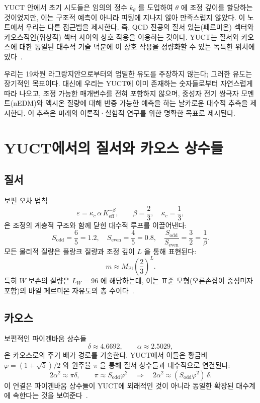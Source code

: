 \documentclass[11pt,a4paper]{article}
\begin{document}
	YUCT 안에서 초기 시도들은 임의의 정수 \(k_\theta\) 를 도입하여 \(\theta\) 에 조정 깊이를 할당하는 것이었지만, 이는 구조적 예측이 아니라 피팅에 지나지 않아 만족스럽지 않았다. 이 노트에서 우리는 다른 접근법을 제시한다. 즉, QCD 진공의 질서 있는(페르미온) 섹터와 카오스적인(위상적) 섹터 사이의 상호 작용을 이용하는 것이다. YUCT는 질서와 카오스에 대한 통일된 대수적 기술 덕분에 이 상호 작용을 정량화할 수 있는 독특한 위치에 있다~\cite{Y2,Feig}.
	
	우리는 19차원 라그랑지안으로부터의 엄밀한 유도를 주장하지 않는다; 그러한 유도는 장기적인 목표이다. 대신에 우리는 YUCT에 이미 존재하는 숫자들로부터 자연스럽게 따라 나오고, 조정 가능한 매개변수를 전혀 포함하지 않으며, 중성자 전기 쌍극자 모멘트(nEDM)와 액시온 질량에 대해 반증 가능한 예측을 하는 날카로운 대수적 추측을 제시한다. 이 추측은 미래의 이론적·실험적 연구를 위한 명확한 목표로 제시된다.
	
	\section{YUCT에서의 질서와 카오스 상수들}
	\label{sec:oc}
	
	\subsection{질서}
	보편 오차 법칙
	\[
	\varepsilon = \kappa_c\,\alpha\,K_{\mathrm{eff}}^{-\beta},\qquad \beta = \frac{2}{3},\quad \kappa_c = \frac{1}{3},
	\]
	은 조정의 계층적 구조와 함께 닫힌 대수적 루프를 이끌어낸다:
	\[
	S_{\mathrm{odd}} = \frac{6}{5} = 1.2,\quad S_{\mathrm{even}} = \frac{4}{5} = 0.8,\quad 
	\frac{S_{\mathrm{odd}}}{S_{\mathrm{even}}} = \frac{3}{2} = \frac{1}{\beta}.
	\]
	모든 물리적 질량은 플랑크 질량과 조정 깊이 \(L\) 을 통해 표현된다:
	\[
	m \approx M_{\mathrm{Pl}}\left(\frac{2}{3}\right)^L.
	\]
	특히 \(W\) 보손의 질량은 \(L_W = 96\) 에 해당하는데, 이는 표준 모형(오른손잡이 중성미자 포함)의 바일 페르미온 자유도의 총 수이다~\cite{Y3}.
	
	\subsection{카오스}
	보편적인 파이겐바움 상수들
	\[
	\delta \approx 4.6692,\qquad \alpha \approx 2.5029,
	\]
	은 카오스로의 주기 배가 경로를 기술한다. YUCT에서 이들은 황금비 \(\varphi = (1+\sqrt{5})/2\) 와 원주율 \(\pi\) 을 통해 질서 상수들과 대수적으로 연결된다:
	\[
	2\alpha^2 \approx \pi\delta,\qquad
	\pi \approx S_{\mathrm{odd}}\varphi^2 \quad \Longrightarrow \quad 
	2\alpha^2 \approx (S_{\mathrm{odd}}\varphi^2)\,\delta .
	\]
	이 연결은 파이겐바움 상수들이 YUCT에 외래적인 것이 아니라 동일한 확장된 대수계에 속한다는 것을 보여준다~\cite{Y2}.
	
\end{document}
